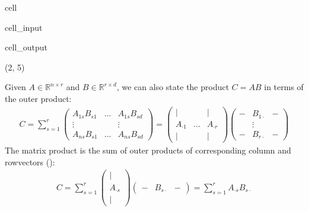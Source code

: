 \documentclass[letterpaper,10pt,english]{jupyterBook}
\begin{document}
\begin{sphinxuseclass}{cell}\begin{sphinxVerbatimInput}

\begin{sphinxuseclass}{cell_input}
\begin{sphinxVerbatim}[commandchars=\\\{\}]
\end{sphinxVerbatim}

\end{sphinxuseclass}\end{sphinxVerbatimInput}
\begin{sphinxVerbatimOutput}

\begin{sphinxuseclass}{cell_output}
\begin{sphinxVerbatim}[commandchars=\\\{\}]
(2, 5)
\end{sphinxVerbatim}

\end{sphinxuseclass}\end{sphinxVerbatimOutput}

\end{sphinxuseclass}
\sphinxAtStartPar
Given \(A\in \mathbb{R}^{n\times r}\) and \(B\in\mathbb{R}^{r\times d}\), we can also state the product \(C=AB\) in terms of the outer product:
\begin{equation*}
\begin{split}C=\sum_{s=1}^r \begin{pmatrix} A_{1 s}B_{s1} &\ldots & A_{1 s}B_{sd}\\ \vdots & & \vdots\\ A_{n s}B_{s1} &\ldots & A_{n s}B_{sd} \end{pmatrix} = \begin{pmatrix} \vert & & \vert\\ A_{\cdot 1}&\ldots & A_{\cdot r}\\ \vert & & \vert \end{pmatrix} \begin{pmatrix} - &B_{1\cdot } & -\\  & \vdots & \\ -& B_{r\cdot} & -\end{pmatrix} \end{split}
\end{equation*}
The matrix product is the sum of outer products of corresponding column\sphinxhyphen{} and row\sphinxhyphen{}vectors ():
\begin{equation*}
\begin{split} C =\sum_{s=1}^r \begin{pmatrix} \vert\\ A_{\cdot s}\\ \vert  \end{pmatrix} \begin{pmatrix} - & B_{s\cdot } & -
\end{pmatrix}=\sum_{s=1}^r A_{\cdot s}B_{s \cdot}\end{split}
\end{equation*}
\end{document}
